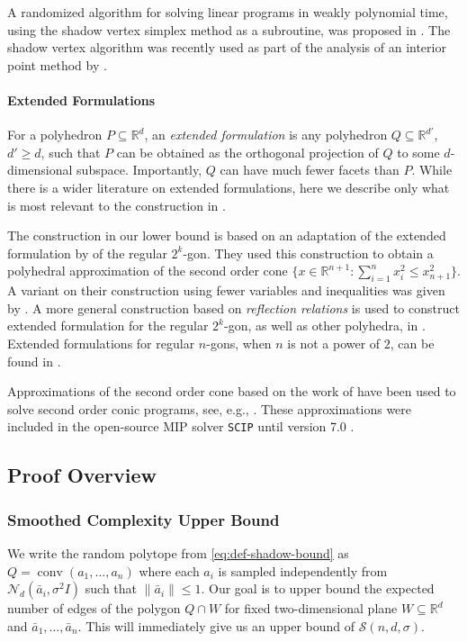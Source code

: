 \documentclass{theoretics}
\newcommand{\R}{\mathbb R}
\newcommand{\conv}{\operatorname{conv}}
\renewcommand{\subset}{\subseteq}
\begin{document}
A randomized algorithm for solving linear programs in weakly polynomial time, using
the shadow vertex simplex method as a subroutine, was proposed in \cite{conf/stoc/KS06}.
The shadow vertex algorithm was recently used as part of the analysis of an interior point method
by \cite{adlnv}.

\paragraph{Extended Formulations}
For a polyhedron $P \subset \R^d$, an \emph{extended formulation}
is any polyhedron $Q \subset \R^{d'}$, $d' \geq d$,
such that $P$ can be obtained as the orthogonal projection of $Q$ to
some $d$-dimensional subspace.
Importantly, $Q$ can have much fewer facets than $P$.
While there is a wider literature on extended formulations,
here we describe only what is most relevant to the construction in .

The construction in our lower bound is based on an adaptation
of the extended formulation by \cite{BN01} of the regular $2^k$-gon.
They used this construction to obtain a polyhedral approximation
of the second order cone
$\{x \in \R^{n+1} : \sum_{i=1}^n x_i^2 \leq x_{n+1}^2\}$.
A variant on their construction using fewer variables and inequalities was
given by \cite{glineur}. A more general construction based on \emph{reflection relations}
is used to construct extended formulation for the regular $2^k$-gon, as well as
other polyhedra, in \cite{Kaibel2013}.
Extended formulations for regular $n$-gons, when $n$ is not a power of $2$,
can be found in \cite{VANDAELE2017217}.

Approximations of the second order cone based on the work of \cite{BN01,
glineur} have been used to solve second order conic programs, see, e.g.,
\cite{Brmann2015}. These approximations were included in the open-source MIP solver
\texttt{SCIP} until version 7.0 \cite{GamrathEtal2020OO}.


\subsection{Proof Overview}

\subsubsection{Smoothed Complexity Upper Bound}


We write the random polytope from \eqref{eq:def-shadow-bound} as $Q = \conv(a_1, \ldots, a_n)$ where each $a_i$ is sampled independently from $\mathcal{N}_d(\bar{a}_i, \sigma^2 I)$ such that $\|\bar{a}_i\| \leq 1$. 
Our goal is to upper bound the expected number of edges of the polygon $Q \cap W$ for
fixed two-dimensional plane $W \subset \R^d$ and $\bar{a}_1, \ldots, \bar{a}_n$. 
This will immediately give us an upper bound of $\mathcal{S}(n, d, \sigma)$.
\end{document}
